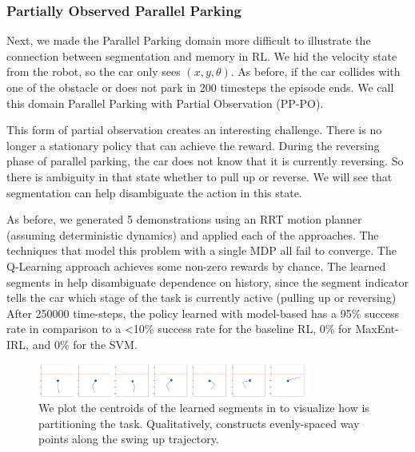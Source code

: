 \subsubsection{Partially Observed Parallel Parking}
Next, we made the Parallel Parking domain more difficult to illustrate the connection between segmentation and memory in RL. 
We hid the velocity state from the robot, so the car only sees $(x,y,\theta)$. 
As before, if the car collides with one of the obstacle or does not park in 200 timesteps the episode ends.
We call this domain Parallel Parking with Partial Observation (PP-PO).

This form of partial observation creates an interesting challenge.
There is no longer a stationary policy that can achieve the reward.
During the reversing phase of parallel parking, the car does not know that it is currently reversing.
So there is ambiguity in that state whether to pull up or reverse.
We will see that segmentation can help disambiguate the action in this state.

As before, we generated 5 demonstrations using an RRT motion planner (assuming deterministic dynamics) and applied each of the approaches.
The techniques that model this problem with a single MDP all fail to converge.
The Q-Learning approach achieves some non-zero rewards by chance.
The learned segments in \hirl help disambiguate dependence on history, since the segment indicator tells the car which stage of the task is currently active (pulling up or reversing)
After 250000 time-steps, the policy learned with model-based \hirl has a 95\% success rate in comparison to a <10\% success rate for the baseline RL, 0\% for MaxEnt-IRL, and 0\% for the SVM.


\begin{figure}[t]
\centering
 \includegraphics[width=0.8\textwidth]{exp/segmentation-acrobot-segments.png}
 \caption{We plot the centroids of the learned segments in \hirl to visualize how \hirl is partitioning the task. Qualitatively, \hirl constructs evenly-spaced way points along the swing up trajectory.  \label{acr-segments}}
\end{figure}


